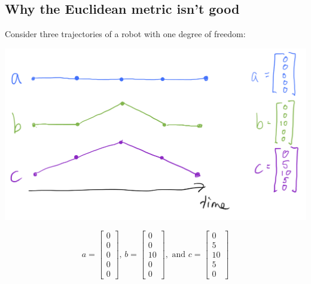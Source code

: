 \documentclass[twoside]{article}
\begin{document}
\subsection{Why the Euclidean metric isn't good}
\label{sec:why-euclidean-metric}

Consider three trajectories of a robot with one degree of freedom:

\begin{center}
\includegraphics[scale=0.3]{figures/trajectory_illustration.png}
\end{center}

\begin{equation}
  \label{eq:3}
  a =
  \begin{bmatrix}
    0 \\
    0 \\
    0 \\
    0 \\
    0
  \end{bmatrix},\, b =
  \begin{bmatrix}
    0 \\
    0 \\
    10 \\
    0 \\
    0
  \end{bmatrix}, \text{ and } c =
  \begin{bmatrix}
    0 \\
    5 \\
    10 \\
    5 \\
    0
  \end{bmatrix}
\end{equation}
\end{document}
